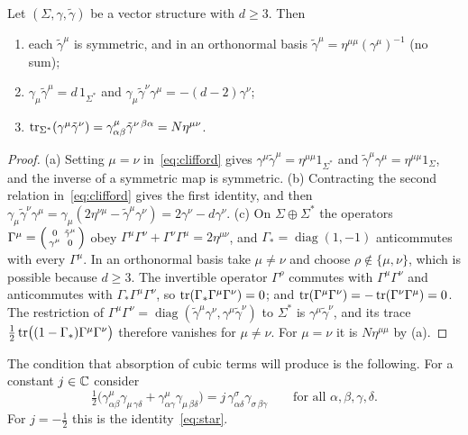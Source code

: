 \begin{lemma}
\label{lem:traces}
Let $(\Sigma,\gamma,\tilde\gamma)$ be a vector structure with $d\ge3$. Then
\begin{enumerate}[label=(\alph*)]
\item each $\tilde\gamma^\mu$ is symmetric, and in an orthonormal basis $\tilde\gamma^\mu=\eta^{\mu\mu}(\gamma^\mu)^{-1}$ (no sum);
\item $\gamma_\mu\tilde\gamma^\mu=d\,1_{\Sigma^*}$ and $\gamma_\mu\tilde\gamma^\nu\gamma^\mu=-(d-2)\gamma^\nu$;
\item $\operatorname{tr}_{\Sigma^*}(\gamma^\mu\tilde\gamma^\nu)=\gamma^\mu_{\alpha\beta}\tilde\gamma^{\nu\,\beta\alpha}=N\eta^{\mu\nu}$.
\end{enumerate}
\end{lemma}

\begin{proof}
(a) Setting $\mu=\nu$ in~\eqref{eq:clifford} gives $\gamma^\mu\tilde\gamma^\mu=\eta^{\mu\mu}1_{\Sigma^*}$ and $\tilde\gamma^\mu\gamma^\mu=\eta^{\mu\mu}1_\Sigma$, and the inverse of a symmetric map is symmetric. (b) Contracting the second relation in~\eqref{eq:clifford} gives the first identity, and then $\gamma_\mu\tilde\gamma^\nu\gamma^\mu=\gamma_\mu(2\eta^{\nu\mu}-\tilde\gamma^\mu\gamma^\nu)=2\gamma^\nu-d\gamma^\nu$. (c) On $\Sigma\oplus\Sigma^*$ the operators $\Gamma^\mu=\begin{psmallmatrix}0&\tilde\gamma^\mu\\ \gamma^\mu&0\end{psmallmatrix}$ obey $\Gamma^\mu\Gamma^\nu+\Gamma^\nu\Gamma^\mu=2\eta^{\mu\nu}$, and $\Gamma_*=\operatorname{diag}(1,-1)$ anticommutes with every $\Gamma^\mu$. In an orthonormal basis take $\mu\ne\nu$ and choose $\rho\notin\{\mu,\nu\}$, which is possible because $d\ge3$. The invertible operator $\Gamma^\rho$ commutes with $\Gamma^\mu\Gamma^\nu$ and anticommutes with $\Gamma_*\Gamma^\mu\Gamma^\nu$, so $\operatorname{tr}(\Gamma_*\Gamma^\mu\Gamma^\nu)=0$; and $\operatorname{tr}(\Gamma^\mu\Gamma^\nu)=-\operatorname{tr}(\Gamma^\nu\Gamma^\mu)=0$. The restriction of $\Gamma^\mu\Gamma^\nu=\operatorname{diag}(\tilde\gamma^\mu\gamma^\nu,\gamma^\mu\tilde\gamma^\nu)$ to $\Sigma^*$ is $\gamma^\mu\tilde\gamma^\nu$, and its trace $\frac12\operatorname{tr}\bigl((1-\Gamma_*)\Gamma^\mu\Gamma^\nu\bigr)$ therefore vanishes for $\mu\ne\nu$. For $\mu=\nu$ it is $N\eta^{\mu\mu}$ by (a).
\end{proof}

The condition that absorption of cubic terms will produce is the following. For a constant $j\in\mathbb{C}$ consider
\begin{equation}
\label{eq:R}
\tfrac12\bigl(\gamma^\mu_{\alpha\beta}\gamma_{\mu\,\gamma\delta}+\gamma^\mu_{\alpha\gamma}\gamma_{\mu\,\beta\delta}\bigr)=j\,\gamma^\sigma_{\alpha\delta}\gamma_{\sigma\,\beta\gamma}\qquad\text{for all }\alpha,\beta,\gamma,\delta.
\end{equation}
For $j=-\frac12$ this is the identity~\eqref{eq:star}.

